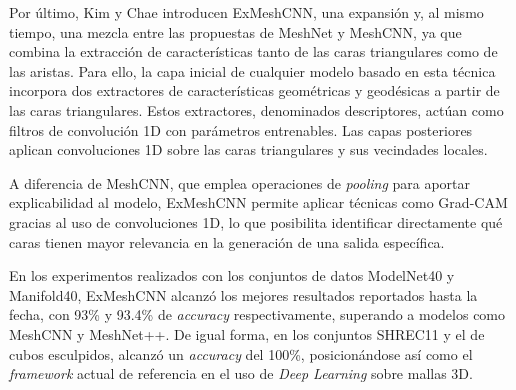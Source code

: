 Por último, Kim y Chae \cite{kim_exmeshcnn_2022} introducen ExMeshCNN, una expansión y, al mismo tiempo, una mezcla entre las propuestas de MeshNet y MeshCNN, ya que combina la extracción de características tanto de las caras triangulares como de las aristas. Para ello, la capa inicial de cualquier modelo basado en esta técnica incorpora dos extractores de características geométricas y geodésicas a partir de las caras triangulares. Estos extractores, denominados descriptores, actúan como filtros de convolución 1D con parámetros entrenables. Las capas posteriores aplican convoluciones 1D sobre las caras triangulares y sus vecindades locales.

A diferencia de MeshCNN, que emplea operaciones de \textit{pooling} para aportar explicabilidad al modelo, ExMeshCNN permite aplicar técnicas como Grad-CAM gracias al uso de convoluciones 1D, lo que posibilita identificar directamente qué caras tienen mayor relevancia en la generación de una salida específica.

En los experimentos realizados con los conjuntos de datos ModelNet40 y Manifold40, ExMeshCNN alcanzó los mejores resultados reportados hasta la fecha, con 93\% y 93.4\% de \textit{accuracy} respectivamente, superando a modelos como MeshCNN y MeshNet++. De igual forma, en los conjuntos SHREC11 y el de cubos esculpidos, alcanzó un \textit{accuracy} del 100\%, posicionándose así como el \textit{framework} actual de referencia en el uso de \textit{Deep Learning} sobre mallas 3D.